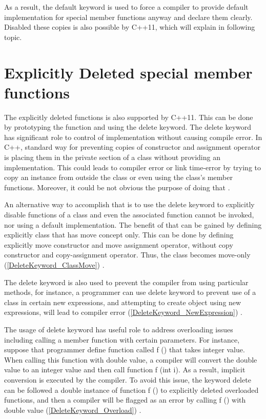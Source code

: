 \documentclass[11pt]{report}
\begin{document}
As a result, the default keyword is used to force a compiler to provide default implementation for special member functions anyway and declare them clearly. Disabled these copies is also possible by C++11, which will explain in following topic.


\section{Explicitly Deleted special member functions}
\label{section: Deleted special member functions}
The explicitly deleted functions is also supported by C++11. This can be done by prototyping the function and using the delete keyword. The delete keyword has significant role to control of implementation without causing compile error. In C++, standard way for preventing copies of constructor and assignment operator is placing them in the private section of a class without providing an implementation. This could leads to compiler error or link time-error by trying to copy an instance from outside the class or even using the class's member functions. Moreover, it could be not obvious the purpose of doing that \cite{Horstmann:2008:BC}.


An alternative way to accomplish that is to use the delete keyword to explicitly disable functions of a class and even the associated function cannot be invoked, nor using a default implementation. The benefit of that can be gained by defining explicitly class that has move concept only. This can be done by defining explicitly move constructor and move assignment operator, without copy constructor and copy-assignment operator. Thus, the class becomes move-only (\ref{DeleteKeyword_ClassMove}) \cite{Horstmann:2008:BC}.


The delete keyword is also used to prevent the compiler from using particular methods, for instance, a programmer can use delete keyword to prevent use of a class in certain new expressions, and attempting to create object using new expressions, will lead to compiler error (\ref{DeleteKeyword_NewExpression}) \cite{ISO:2011:Cpplanguage}.


The usage of delete keyword has useful role to address overloading issues including calling a member function with certain parameters.  For instance, suppose that programmer define function called f () that takes integer value. When calling this function with double value, a compiler will convert the double value to an integer value and then call function f (int i). As a result, implicit conversion is executed by the compiler. To avoid this issue, the keyword delete can be followed a double instance of function f () to explicitly deleted overloaded functions, and then a compiler will be flagged as an error by calling f () with double value (\ref{DeleteKeyword_Overload}) \cite{Gregorie:professionalcpp}.
\end{document}
